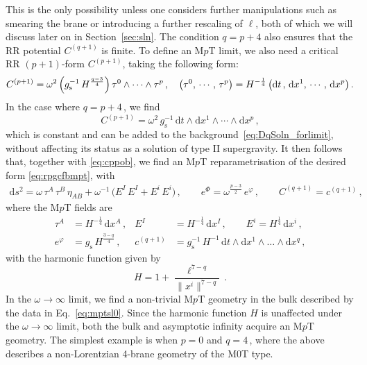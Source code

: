 \documentclass[11pt]{article}
\newcommand{\be}{\begin{equation}}
\newcommand{\ee}{\end{equation}}
\newcommand{\dd}{\mathrm{d}}
\begin{document}
This is the only possibility unless one considers further manipulations such as smearing the brane or introducing a further rescaling of $\ell$, both of which we will discuss later on in Section~\ref{sec:sln}.
The condition  $q=p+4$ also ensures that the RR potential $C^{(q+1)}$ is finite.
To define an M$p$T limit, we also need a critical RR $(p+1)$-form $C^{(p+1)}$, taking the following form: 
%
\be
    C^{(p+1)} = \omega^2 \, \Bigl( g^{-1}_\text{s} \, H^{\frac{q-3}{4}} \Bigr) \, \tau^0 \wedge \cdots \wedge \tau^p\,,
        \quad%
    \bigl( \tau^0, \, \cdots, \, \tau^p \bigr) = H^{-\frac{1}{4}} \, \bigl( \dd t\,, \, \dd x^1, \, \cdots, \, \dd x^p \bigr)\,.
\ee
%
In the case where $q = p + 4$\,, we find
%
\be \label{eq:cppob}
    C^{(p+1)} = \omega^2 \, g^{-1}_\text{s} \, \dd t \wedge \dd x^1 \wedge \cdots \wedge \dd x^p\,,
\ee
%
which is constant and can be added to the background~\eqref{eq:DqSoln_forlimit}, without affecting its status as a solution of type II supergravity. It then follows that, together with \eqref{eq:cppob}, we find an M$p$T reparametrisation of the desired form \eqref{eq:rpgcfbmpt}, with
%
\begin{align}
    \dd s^2 = \omega \, \tau^A \, \tau^B \, \eta^{}_{AB} 
    + \omega^{-1} \, \bigl( E^I \, E^I + E^i \, E^i \bigr)\,, 
        \qquad%
    e^\Phi = \omega^{\frac{p-3}{2}} \, e^{\varphi}\,,
        \qquad%
    C^{(q+1)} = c^{(q+1)}\,,
\end{align}
%
where the M$p$T fields are
%
\begin{subequations} \label{eq:mptsl0}
\begin{align} 
    \tau^{A} & = H^{-\frac{1}{4}} \, \dd x^A \,,
        &%
    E^{I} & = H^{-\frac{1}{4}} \, \dd x^{I} \,,
        \qquad%
    E^{i} = H^{\frac{1}{4}} \, \dd x^{i} \,,\\[4pt]
    e^{\varphi} & = g^{}_\text{s} \, H^{\frac{3-q}{4}} \,,
        &%
    c^{(q+1)} & = g_\text{s}^{-1} \, H^{-1} \, \dd t \wedge \dd x^1 \wedge \dots \wedge \dd x^{q} \,,
\end{align}
\end{subequations}
%
with the harmonic function given by 
%
\be \label{eq:hfmpt}
    H = 1 + \frac{\ell^{7-q}}{\| x^i \|^{7-q}}\,.
\ee
%
In the $\omega \rightarrow \infty$ limit, we find a non-trivial M$p$T geometry in the bulk described by the data in Eq.~\eqref{eq:mptsl0}. Since the harmonic function $H$ is unaffected under the $\omega \rightarrow \infty$ limit, both the bulk and asymptotic infinity acquire an M$p$T geometry. The simplest example is when $p = 0$ and $q = 4$\,, where the above describes a non-Lorentzian 4-brane geometry of the M0T type. 
%
\end{document}
